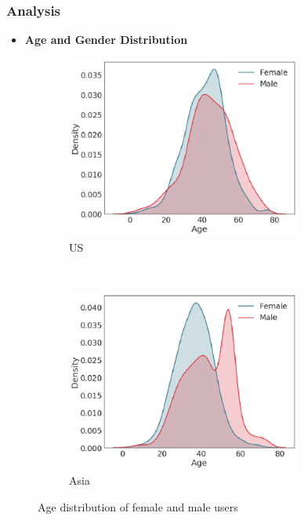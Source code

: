 \documentclass{beamer}
\begin{document}
    \begin{frame}
        \frametitle{Analysis}
        \begin{itemize}
            \item \textbf{Age and Gender Distribution}\pause
        \end{itemize}
        \begin{figure}[h]
            \centering
            \begin{subfigure}{0.45\textwidth}
                \includegraphics[width=0.85\textwidth]{SS1}
                \caption{US}
            \end{subfigure} \pause
            ~
            \begin{subfigure}{0.45\textwidth}
                \includegraphics[width=0.85\textwidth]{SS2}
                \caption{Asia}
            \end{subfigure}
            \caption{Age distribution of female and male users}
        \end{figure}
       
    \end{frame}
   
\end{document}
